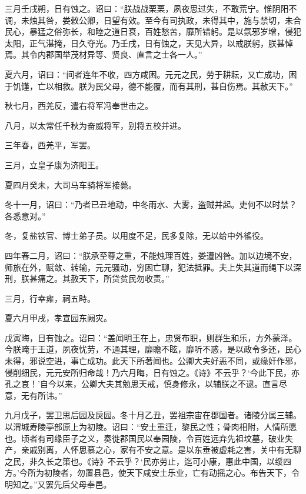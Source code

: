 \documentclass[12pt,UTF8]{ctexbook}
\begin{document}
三月壬戌朔，日有蚀之。诏曰：“朕战战栗栗，夙夜思过失，不敢荒宁。惟阴阳不调，未烛其咎，娄敕公卿，日望有效。至今有司执政，未得其中，施与禁切，未合民心，暴猛之俗弥长，和睦之道日衰，百姓愁苦，靡所错躬。是以氛邪岁增，侵犯太阳，正气湛掩，日久夺光。乃壬戌，日有蚀之，天见大异，以戒朕躬，朕甚悼焉。其令内郡国举茂材异等、贤良、直言之士各一人。”



夏六月，诏曰：“间者连年不收，四方咸困。元元之民，劳于耕耘，又亡成功，困于饥馑，亡以相救。朕为民父母，德不能覆，而有其刑，甚自伤焉。其赦天下。”



秋七月，西羌反，遣右将军冯奉世击之。



八月，以太常任千秋为奋威将军，别将五校并进。



三年春，西羌平，军罢。



三月，立皇子康为济阳王。



夏四月癸未，大司马车骑将军接薨。



冬十一月，诏曰：“乃者已丑地动，中冬雨水、大雾，盗贼并起。吏何不以时禁？各悉意对。”



冬，复盐铁官、博士弟子员。以用度不足，民多复除，无以给中外徭役。



四年春二月，诏曰：“朕承至尊之重，不能烛理百姓，娄遭凶咎。加以边境不安，师旅在外，赋敛、转输，元元骚动，穷困亡聊，犯法抵罪。夫上失其道而绳下以深刑，朕甚痛之。其赦天下，所贷贫民勿收责。”



三月，行幸雍，祠五畤。



夏六月甲戌，孝宣园东阙灾。



戊寅晦，日有蚀之。诏曰：“盖闻明王在上，忠贤布职，则群生和乐，方外蒙泽。今朕晻于王道，夙夜忧劳，不通其理，靡瞻不眩，靡听不惑，是以政令多还，民心未得，邪说空进，事亡成功。此天下所著闻也。公卿大夫好恶不同，或缘奸作邪，侵削细民，元元安所归命哉！乃六月晦，日有蚀之。《诗》不云乎？‘今此下民，亦孔之哀！’自今以来，公卿大夫其勉思天戒，慎身修永，以辅朕之不逮。直言尽意，无有所讳。”



九月戊子，罢卫思后园及戾园。冬十月乙丑，罢祖宗宙在郡国者。诸陵分属三辅。以渭城寿陵亭部原上为初陵。诏曰：“安土重迁，黎民之性；骨肉相附，人情所愿也。顷者有司缘臣子之义，奏徙郡国民以奉园陵，令百姓远弃先祖坟墓，破业失产，亲戚别离，人怀思慕之心，家有不安之意。是以东垂被虚耗之害，关中有无聊之民，非久长之策也。《诗》不云乎？‘民亦劳止，迄可小康，惠此中国，以绥四方。’今所为初陵者，勿置县邑，使天下咸安土乐业，亡有动摇之心。布告天下，令明知之。”又罢先后父母奉邑。
\end{document}
